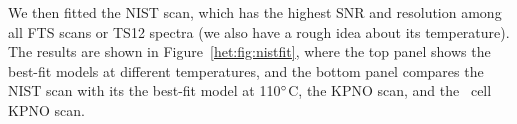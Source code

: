 We then fitted the NIST scan, which has the highest SNR and
resolution among all FTS scans or TS12 spectra (we also have a rough
idea about its temperature). The results are shown in
Figure~\ref{het:fig:nistfit}, where the top panel shows the best-fit
models at different temperatures, and the bottom panel compares the
NIST scan with its the best-fit model at 110$^{\circ}$C, the KPNO scan,
and the \keck\ cell KPNO scan. 


\begin{figure}
\centering
{}\

\end{figure}
